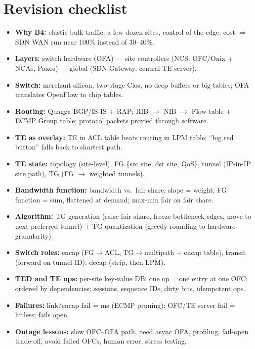 \section{Revision checklist}
\begin{itemize}
\item \textbf{Why B4:} elastic bulk traffic, a few dozen sites, control of the edge, cost $\Rightarrow$ SDN WAN run near 100\% instead of 30--40\%.
\item \textbf{Layers:} switch hardware (OFA) --- site controllers (NCS: OFC/Onix + NCAs, Paxos) --- global (SDN Gateway, central TE server).
\item \textbf{Switch:} merchant silicon, two-stage Clos, no deep buffers or big tables; OFA translates OpenFlow to chip tables.
\item \textbf{Routing:} Quagga BGP/IS-IS + RAP; RIB $\to$ NIB $\to$ Flow table + ECMP Group table; protocol packets proxied through software.
\item \textbf{TE as overlay:} TE in ACL table beats routing in LPM table; ``big red button'' falls back to shortest path.
\item \textbf{TE state:} topology (site-level), FG \{src site, dst site, QoS\}, tunnel (IP-in-IP site path), TG (FG $\to$ weighted tunnels).
\item \textbf{Bandwidth function:} bandwidth vs.\ fair share, slope = weight; FG function = sum, flattened at demand; max-min fair on fair share.
\item \textbf{Algorithm:} TG generation (raise fair share, freeze bottleneck edges, move to next preferred tunnel) + TG quantization (greedy rounding to hardware granularity).
\item \textbf{Switch roles:} encap (FG$\to$ACL, TG$\to$multipath + encap table), transit (forward on tunnel ID), decap (strip, then LPM).
\item \textbf{TED and TE ops:} per-site key-value DB; one op = one entry at one OFC; ordered by dependencies; sessions, sequence IDs, dirty bits, idempotent ops.
\item \textbf{Failures:} link/encap fail = ms (ECMP pruning); OFC/TE server fail = hitless; fails open.
\item \textbf{Outage lessons:} slow OFC--OFA path, need async OFA, profiling, fail-open trade-off, avoid failed OFCs, human error, stress testing.
\end{itemize}

